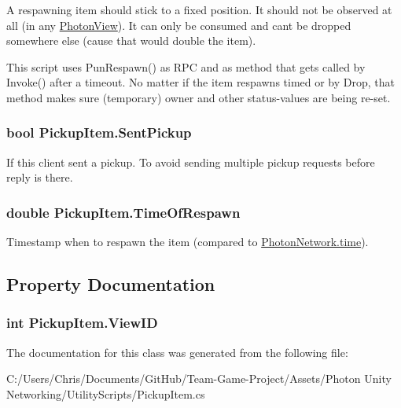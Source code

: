A respawning item should stick to a fixed position. It should not be observed at all (in any \hyperlink{class_photon_view}{Photon\+View}). It can only be consumed and can\textquotesingle{}t be dropped somewhere else (cause that would double the item).

This script uses Pun\+Respawn() as R\+PC and as method that gets called by Invoke() after a timeout. No matter if the item respawns timed or by Drop, that method makes sure (temporary) owner and other status-\/values are being re-\/set. 
\subsubsection[{\texorpdfstring{Sent\+Pickup}{SentPickup}}]{\setlength{\rightskip}{0pt plus 5cm}bool Pickup\+Item.\+Sent\+Pickup}\hypertarget{class_pickup_item_a2cb53f4bb11cda01690309bf2de67894}{}\label{class_pickup_item_a2cb53f4bb11cda01690309bf2de67894}


If this client sent a pickup. To avoid sending multiple pickup requests before reply is there.

\subsubsection[{\texorpdfstring{Time\+Of\+Respawn}{TimeOfRespawn}}]{\setlength{\rightskip}{0pt plus 5cm}double Pickup\+Item.\+Time\+Of\+Respawn}\hypertarget{class_pickup_item_a73055debb47c9bcf0813e74a0fd6e3ee}{}\label{class_pickup_item_a73055debb47c9bcf0813e74a0fd6e3ee}


Timestamp when to respawn the item (compared to \hyperlink{class_photon_network_a86ab96957666ef72830a35662ef3d30b}{Photon\+Network.\+time}). 



\subsection{Property Documentation}
\subsubsection[{\texorpdfstring{View\+ID}{ViewID}}]{\setlength{\rightskip}{0pt plus 5cm}int Pickup\+Item.\+View\+ID\hspace{0.3cm}{\ttfamily [get]}}\hypertarget{class_pickup_item_a51ef87cc3a26bfe0006b66ac3a2fd056}{}\label{class_pickup_item_a51ef87cc3a26bfe0006b66ac3a2fd056}






The documentation for this class was generated from the following file\+:\begin{DoxyCompactItemize}
\item 
C\+:/\+Users/\+Chris/\+Documents/\+Git\+Hub/\+Team-\/\+Game-\/\+Project/\+Assets/\+Photon Unity Networking/\+Utility\+Scripts/Pickup\+Item.\+cs\end{DoxyCompactItemize}
